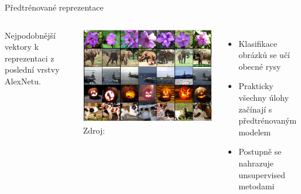 \documentclass[aspectratio=169,dvipsnames]{beamer}
\begin{document}
\begin{frame}{Předtrénované reprezentace}

    \begin{columns}

        \centering

        Nejpodobnější vektory k reprezentaci z poslední vrstvy AlexNetu.

        \includegraphics[scale=0.25]{./img/alexnet_neighbors.png} \\
        {\tiny Zdroj: \citet[obr.\ 4]{krizhevsky_imagenet_2012}}



    \begin{itemize}[<+->]

        \item Klasifikace obrázků se učí obecné rysy

        \item Prakticky všechny úlohy začínají s předtrénovaným modelem

        \item Postupně se nahrazuje unsupervised metodami

    \end{itemize}


    \end{columns}

\end{frame}

\end{document}
